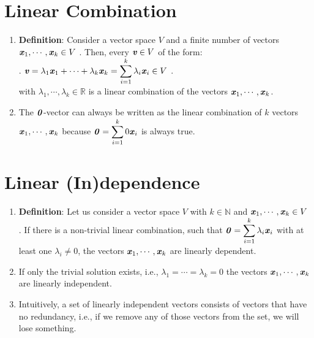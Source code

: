 \section{Linear Combination}

\begin{enumerate}
    \item \textbf{Definition}: Consider a vector space $V$ and a finite number of vectors $\text{\textbf{\textit{x}}}_1, \cdots , \text{\textbf{\textit{x}}}_k \in V$ . 
    Then, every $\text{\textbf{\textit{v}}} \in V$ of the form:
    \\
    .\hfill
    $
        \text{\textbf{\textit{v}}} 
        = \lambda _1 \text{\textbf{\textit{x}}}_1 + \cdots + \lambda _k \text{\textbf{\textit{x}}}_k
        = \displaystyle\sum_{i=1}^k \lambda _i \text{\textbf{\textit{x}}}_i
        \in V
    $
    \hfill.
    \\
    with $\lambda _1, \cdots , \lambda _k \in \mathbb{R}$ is a linear combination of the vectors $\text{\textbf{\textit{x}}}_1, \cdots , \text{\textbf{\textit{x}}}_k$.
    \hfill \cite{mfml/book/mml/Deisenroth-Faisal-Ong}

    \item The $\text{\textbf{\textit{0}}}$-vector can always be written as the linear combination of $k$ vectors $\text{\textbf{\textit{x}}}_1, \cdots , \text{\textbf{\textit{x}}}_k$ because $\text{\textbf{\textit{0}}} = \displaystyle\sum ^k _{i=1} 0 \text{\textbf{\textit{x}}}_i$ is always true.
    \hfill \cite{mfml/book/mml/Deisenroth-Faisal-Ong}

    
\end{enumerate}



\section{Linear (In)dependence}

\begin{enumerate}
    \item \textbf{Definition}: Let us consider a vector space $V$ with $k \in \mathbb{N}$ and $\text{\textbf{\textit{x}}}_1, \cdots , \text{\textbf{\textit{x}}}_k \in V$ . 
    If there is a non-trivial linear combination, such that $\text{\textbf{\textit{0}}} = \displaystyle\sum ^k _{i=1} \lambda_i \text{\textbf{\textit{x}}}_i$ with at least one $\lambda _i \neq 0$, the vectors  $\text{\textbf{\textit{x}}}_1, \cdots , \text{\textbf{\textit{x}}}_k$ are linearly dependent. 
    \hfill \cite{mfml/book/mml/Deisenroth-Faisal-Ong}
    
    \item If only the trivial solution exists, i.e., $\lambda _1 = \cdots = \lambda _k = 0$ the vectors $\text{\textbf{\textit{x}}}_1, \cdots , \text{\textbf{\textit{x}}}_k$ are linearly independent.
    \hfill \cite{mfml/book/mml/Deisenroth-Faisal-Ong}

    \item Intuitively, a set of linearly independent vectors consists of vectors that have no redundancy, i.e., if we remove any of those vectors from the set, we will lose something.
    \hfill \cite{mfml/book/mml/Deisenroth-Faisal-Ong}
\end{enumerate}


